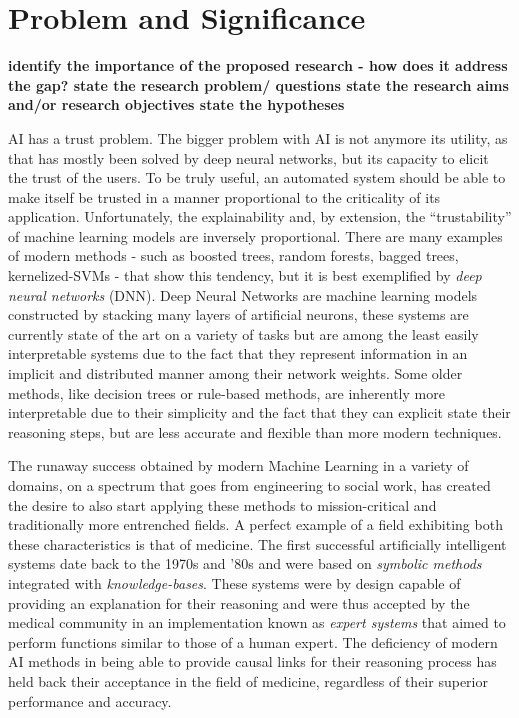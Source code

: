 
\section{Problem and Significance}
\textbf{identify the importance of the proposed research - how does it address the gap? state the research problem/ questions state the research aims and/or research objectives state the hypotheses
}


AI has a trust problem.  The bigger problem with AI is not anymore its utility, as that has mostly been solved by  deep neural networks, but its capacity to elicit the trust of the users.
To be truly useful, an automated system should be able to make itself be trusted in a manner proportional to the criticality of its application.  Unfortunately, the explainability and, by extension, the \enquote{trustability} of machine learning models are inversely proportional.  There are many examples of modern methods - such as boosted trees, random forests, bagged trees, kernelized-SVMs - that show this tendency, but it is best exemplified by\textit{ deep neural networks} (DNN). Deep Neural Networks are machine learning models constructed by stacking many layers of artificial neurons, these systems are currently state of the art on a variety of tasks but are among the least easily interpretable systems due to the fact that they represent information in an implicit and distributed manner among their network weights.  Some older methods, like decision trees or rule-based methods, are inherently more interpretable due to their simplicity and the fact that they can explicit state their reasoning steps, but are less accurate and flexible than more modern techniques. 

The runaway success obtained by modern Machine Learning in a variety of domains, on a spectrum that goes from engineering to social work, has created the desire to also start applying these methods to mission-critical and traditionally more entrenched fields.  A perfect example of a field exhibiting both these characteristics is that of medicine.  The first successful artificially intelligent systems date back to the 1970s and '80s and were based on \textit{symbolic methods} integrated with \textit{knowledge-bases}.  These systems were by design capable of providing an explanation for their reasoning and were thus accepted by the medical community in an implementation known as \textit{expert systems} that aimed to perform functions similar to those of a human expert.  The deficiency of modern AI methods in being able to provide causal links for their reasoning process has held back their acceptance in the field of medicine, regardless of their superior performance and accuracy.

